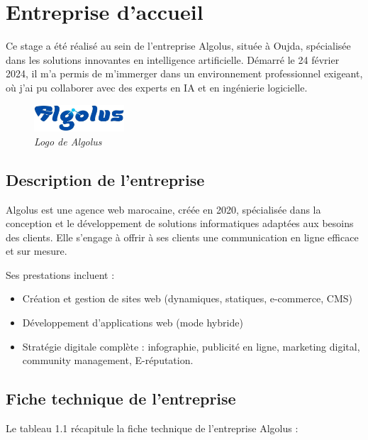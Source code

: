 \documentclass[12pt,a4paper]{report}
\begin{document}
	\section{Entreprise d’accueil}
	
	Ce stage a été réalisé au sein de l’entreprise Algolus, située à Oujda, spécialisée dans les solutions innovantes en intelligence artificielle. Démarré le 24 février 2024, il m’a permis de m’immerger dans un environnement professionnel exigeant, où j’ai pu collaborer avec des experts en IA et en ingénierie logicielle.
	
	\begin{figure}[H]
		\centering
		\includegraphics[width=0.3\textwidth]{algolus-logo.png}
		\caption{\textit{Logo de Algolus}}
		\label{fig:algolus-logo}
	\end{figure}
	
	\subsection{Description de l’entreprise}
	
	Algolus est une agence web marocaine, créée en 2020, spécialisée dans la conception et le développement de solutions informatiques adaptées aux besoins des clients. Elle s'engage à offrir à ses clients une communication en ligne efficace et sur mesure.

	Ses prestations incluent :
	
	\renewcommand{\labelitemi}{$\bullet$}
	\begin{itemize}
		\item Création et gestion de sites web (dynamiques, statiques, e-commerce, CMS)
		\item Développement d'applications web (mode hybride)
		\item Stratégie digitale complète : infographie, publicité en ligne, marketing digital, community management, E-réputation.
	\end{itemize}
	
	\subsection{Fiche technique de l'entreprise}
	
	Le tableau 1.1 récapitule la fiche technique de l'entreprise Algolus :
	
\end{document}
